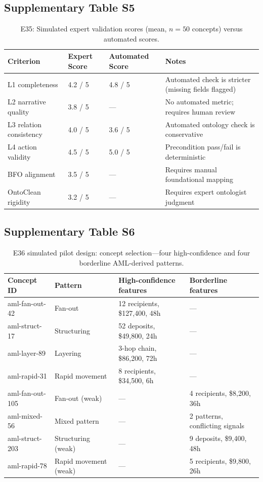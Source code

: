 \subsection{Supplementary Table S5}\label{tab:S5}
\begin{table}[htbp]
\centering
\small
\caption{E35: Simulated expert validation scores (mean, $n=50$ concepts) versus automated scores.}
\label{tab:e35-expert}
\begin{tabular}{@{}p{3.5cm}p{2.5cm}p{2.5cm}p{3.5cm}@{}}
\toprule
\textbf{Criterion} & \textbf{Expert Score} & \textbf{Automated Score} & \textbf{Notes} \\
\midrule
L1 completeness & 4.2 / 5 & 4.8 / 5 & Automated check is stricter (missing fields flagged) \\
L2 narrative quality & 3.8 / 5 & --- & No automated metric; requires human review \\
L3 relation consistency & 4.0 / 5 & 3.6 / 5 & Automated ontology check is conservative \\
L4 action validity & 4.5 / 5 & 5.0 / 5 & Precondition pass/fail is deterministic \\
BFO alignment & 3.5 / 5 & --- & Requires manual foundational mapping \\
OntoClean rigidity & 3.2 / 5 & --- & Requires expert ontologist judgment \\
\bottomrule
\end{tabular}
\end{table}

\subsection{Supplementary Table S6}\label{tab:S6}
\begin{table}[htbp]
\centering
\small
\caption{E36 simulated pilot design: concept selection---four high-confidence and four borderline AML-derived patterns.}
\label{tab:e36-concepts}
\begin{tabular}{@{}p{2.5cm}p{2.5cm}p{3.5cm}p{3.5cm}@{}}
\toprule
\textbf{Concept ID} & \textbf{Pattern} & \textbf{High-confidence features} & \textbf{Borderline features} \\
\midrule
aml-fan-out-42 & Fan-out & 12 recipients, \$127,400, 48h & --- \\
aml-struct-17 & Structuring & 52 deposits, \$49,800, 24h & --- \\
aml-layer-89 & Layering & 3-hop chain, \$86,200, 72h & --- \\
aml-rapid-31 & Rapid movement & 8 recipients, \$34,500, 6h & --- \\
aml-fan-out-105 & Fan-out (weak) & --- & 4 recipients, \$8,200, 36h \\
aml-mixed-56 & Mixed pattern & --- & 2 patterns, conflicting signals \\
aml-struct-203 & Structuring (weak) & --- & 9 deposits, \$9,400, 48h \\
aml-rapid-78 & Rapid movement (weak) & --- & 5 recipients, \$9,800, 26h \\
\bottomrule
\end{tabular}
\end{table}

